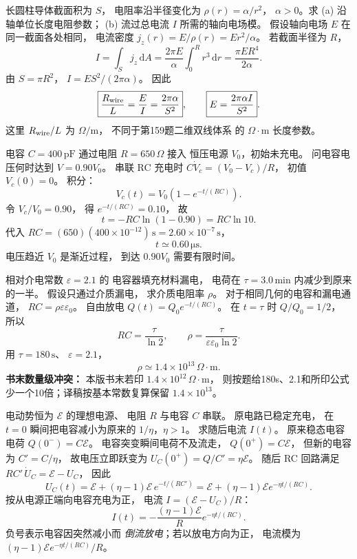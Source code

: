 长圆柱导体截面积为 $S$，
电阻率沿半径变化为
$\rho(r)=\alpha/r^2$，
$\alpha>0$。求 (a) 沿轴单位长度电阻参数；
(b) 流过总电流 $I$ 所需的轴向电场模。
\exsolution
假设轴向电场 $E$ 在同一截面各处相同，
电流密度
$j_z(r)=E/\rho(r)=Er^2/\alpha$。
若截面半径为 $R$，
\[
I=\int_Sj_z\,\mathrm dA
=\frac{2\pi E}{\alpha}\int_0^Rr^3\,\mathrm dr
=\frac{\pi ER^4}{2\alpha}.
\]
由 $S=\pi R^2$，
$I=ES^2/(2\pi\alpha)$。
因此
\[
\boxed{\frac{R_{\rm wire}}{L}
=\frac E I=\frac{2\pi\alpha}{S^2}},
\qquad
\boxed{E=\frac{2\pi\alpha I}{S^2}}.
\]
\excheck 这里 $R_{\rm wire}/L$ 为
$\Omega/\mathrm m$，
不同于第159题二维双线体系
的 $\Omega\cdot\mathrm m$ 长度参数。

电容 $C=400\,\mathrm{pF}$
通过电阻 $R=650\,\Omega$ 接入
恒压电源 $V_0$，初始未充电。
问电容电压何时达到 $V=0.90V_0$。
\exsolution
串联 RC 充电时
$C\dot V_c=(V_0-V_c)/R$，
初值 $V_c(0)=0$。
积分：
\[
V_c(t)=V_0(1-e^{-t/(RC)}).
\]
令 $V_c/V_0=0.90$，
得 $e^{-t/(RC)}=0.10$，
故
\[
\boxed{t=-RC\ln(1-0.90)=RC\ln10}.
\]
代入
$RC=(650)(400\times10^{-12})\,\mathrm s
=2.60\times10^{-7}\,\mathrm s$，
\[
\boxed{t\simeq0.60\,\mathrm{\mu s}}.
\]
\excheck 电压趋近 $V_0$ 是渐近过程，
到达 $0.90V_0$ 需要有限时间。

相对介电常数 $\varepsilon=2.1$ 的
电容器填充材料漏电，
电荷在 $\tau=3.0\,\mathrm{min}$
内减少到原来的一半。
假设只通过介质漏电，
求介质电阻率 $\rho$。
\exsolution
对于相同几何的电容和漏电通道，
$RC=\rho\varepsilon\varepsilon_0$。
自由放电
$Q(t)=Q_0e^{-t/(RC)}$。
在 $t=\tau$ 时 $Q/Q_0=1/2$，
所以
\[
RC=\frac{\tau}{\ln2},
\qquad
\boxed{\rho=
\frac{\tau}{\varepsilon\varepsilon_0\ln2}}.
\]
用 $\tau=180\,\mathrm s$、
$\varepsilon=2.1$，
\[
\boxed{\rho\simeq1.4\times10^{13}\,\Omega\cdot\mathrm m}.
\]
\excheck \textbf{书末数量级冲突：}
本版书末若印
$1.4\times10^{12}\,\Omega\cdot\mathrm m$，
则按题给180s、2.1和所印公式
少一个10倍；译稿按基本常数复算保留
$1.4\times10^{13}$。

电动势恒为 $\mathcal E$ 的理想电源、
电阻 $R$ 与电容 $C$ 串联。
原电路已稳定充电，
在 $t=0$ 瞬间把电容减小为原来的
$1/\eta$，$\eta>1$。
求随后电流 $I(t)$。
\exsolution
原来稳态电容电荷
$Q(0^-)=C\mathcal E$。
电容突变瞬间电荷不及流走，
$Q(0^+)=C\mathcal E$，
但新的电容为 $C'=C/\eta$，
故电压立即跃变为
$U_C(0^+)=Q/C'=\eta\mathcal E$。
随后 RC 回路满足
$RC'\,\dot U_C=\mathcal E-U_C$，
因此
\[
U_C(t)=\mathcal E+
(\eta-1)\mathcal E\,e^{-t/(RC')}
=\mathcal E+(\eta-1)\mathcal E
e^{-\eta t/(RC)}.
\]
按从电源正端向电容充电为正，
电流 $I=(\mathcal E-U_C)/R$：
\[
\boxed{I(t)=
-\frac{(\eta-1)\mathcal E}{R}
e^{-\eta t/(RC)}}.
\]
\excheck 负号表示电容因突然减小而
\emph{倒流放电}；若以放电方向为正，
电流模为 $(\eta-1)\mathcal E
e^{-\eta t/(RC)}/R$。

